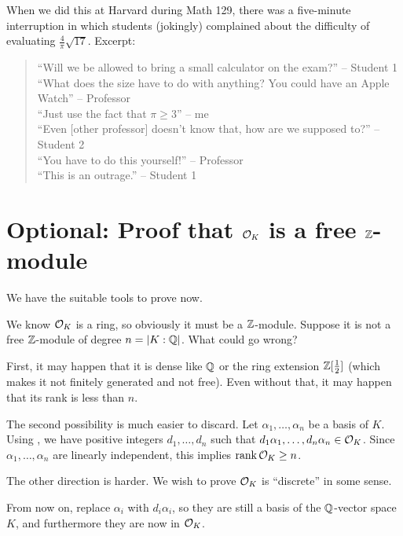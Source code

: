 \begin{remark}
	When we did this at Harvard during Math 129,
	there was a five-minute interruption in which students (jokingly) complained
	about the difficulty of evaluating $\frac{4}{\pi} \sqrt{17}$. Excerpt:
	\begin{quote}
		``Will we be allowed to bring a small calculator on the exam?'' -- Student 1 \\
		``What does the size have to do with anything?  You could have an Apple Watch'' -- Professor \\
		``Just use the fact that $\pi \ge 3$'' -- me \\
		``Even [other professor] doesn't know that, how are we supposed to?'' -- Student 2 \\
		``You have to do this yourself!'' -- Professor \\
		``This is an outrage.'' -- Student 1
	\end{quote}
\end{remark}

\section{Optional: Proof that $\mathcal O_K$ is a free $\mathbb Z$-module}

We have the suitable tools to prove  now.

We know $\mathcal O_K$ is a ring, so obviously it must be a $\mathbb Z$-module.
Suppose it is not a free $\mathbb Z$-module of degree $n = |K:\mathbb Q|$. What could go wrong?
\begin{itemize}
	\ii First, it may happen that it is dense like $\mathbb Q$ or the ring extension $\mathbb Z[\frac{1}{2}]$
	(which makes it not finitely generated and not free).
	\ii Even without that, it may happen that its rank is less than $n$.
\end{itemize}

The second possibility is much easier to discard.
Let $\alpha_1, \dots, \alpha_n$ be a basis of $K$.
Using , we have positive integers $d_1, \dots, d_n$ such that
$d_1 \alpha_1, \dots, d_n \alpha_n \in \mathcal O_K$.
Since $\alpha_1, \dots, \alpha_n$ are linearly independent,
this implies $\operatorname{rank} \mathcal O_K \geq n$.

The other direction is harder. We wish to prove $\mathcal O_K$ is ``discrete'' in some sense.

From now on, replace $\alpha_i$ with $d_i \alpha_i$, so they are still a basis of the $\mathbb Q$-vector
space $K$, and furthermore they are now in $\mathcal O_K$.

